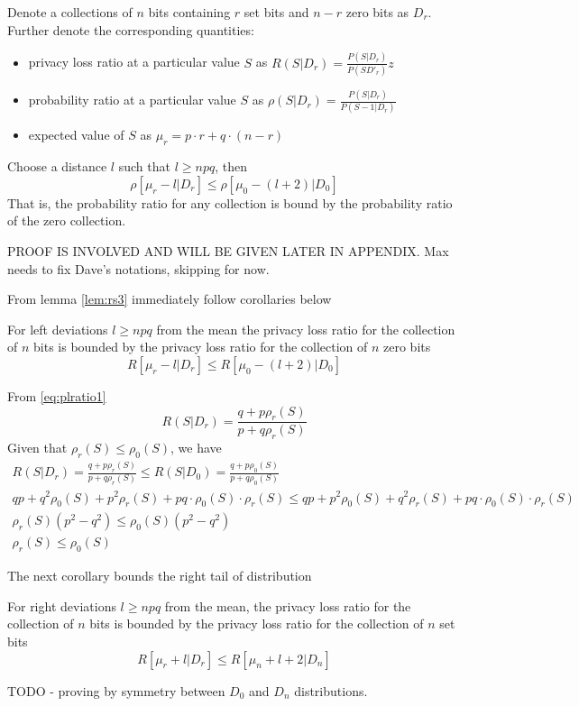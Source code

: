 \documentclass[11pt]{article}
\begin{document}
\begin{lem} \label{lem:rs3}
Denote a collections of $n$ bits containing $r$ set bits and $n-r$ zero bits as $D_r$. Further denote the corresponding quantities:
\begin{itemize}
\item privacy loss ratio at a particular value $S$ as $R(S|D_r) = \frac{P(S|D_r)}{P(SD'_r)}z$
\item probability ratio at a particular value $S$ as $\rho(S|D_r) = \frac{P(S|D_r)}{P(S-1|D_r)}$
\item expected value of $S$ as $\mu_r = p \cdot r + q \cdot (n-r)$
\end{itemize}
Choose a distance $l$ such that $l \ge npq$, then 
\[ \rho[\mu_r - l|D_r] \le \rho[\mu_0 - (l+2)|D_0] \]
That is, the probability ratio for any collection is bound by the probability ratio of the zero collection. 
\end{lem}
\begin{pf}
PROOF IS INVOLVED AND WILL BE GIVEN LATER IN APPENDIX.  Max needs to fix Dave's notations, skipping for now.
\end{pf}

From lemma \eqref{lem:rs3} immediately follow corollaries below
\begin{cor}
For left deviations $l \ge npq$ from the mean the privacy loss ratio for the collection of $n$ bits is bounded by the privacy loss ratio for the collection of $n$ zero bits
\[ R[\mu_r - l|D_r] \le R[\mu_0 - (l+2)|D_0] \]
\end{cor}
\begin{pf}
From  \eqref{eq:plratio1} \[ R(S|D_r) = \frac{q + p\rho_r(S)}{p + q\rho_r(S)} \] 
Given that $\rho_r(S) \le \rho_0(S)$, we have 
\begin{align*}
R(S|D_r) = \frac{q + p\rho_r(S)}{p + q\rho_r(S)} \le R(S|D_0) = \frac{q + p\rho_0(S)}{p + q\rho_0(S)} \\
qp + q^2\rho_0(S) + p^2 \rho_r(S) + pq \cdot \rho_0(S) \cdot \rho_r(S) \le qp + p^2\rho_0(S) + q^2 \rho_r(S) + pq \cdot \rho_0(S) \cdot \rho_r(S) \\
\rho_r(S) (p^2 - q^2) \le \rho_0(S) (p^2 - q^2)  \\
\rho_r(S) \le \rho_0(S)
\end{align*} 
\end{pf}

The next corollary bounds the right tail of distribution
\begin{cor}
For right deviations $l \ge npq$ from the mean, the privacy loss ratio for the collection of $n$ bits is bounded by the privacy loss ratio for the collection of $n$ set bits
\[ R[\mu_r + l|D_r] \le R[\mu_n + l+2 |D_n] \]
\end{cor}
\begin{pf}
TODO - proving by symmetry between $D_0$ and $D_n$ distributions. 
\end{pf}
\end{document}
